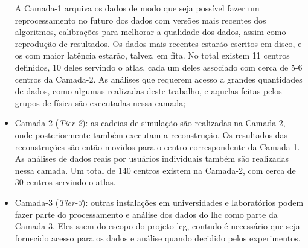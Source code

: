 \begin{itemize}
A Camada-1 arquiva os dados de modo que seja possível fazer um reprocessamento 
no futuro dos dados com versões mais recentes dos algoritmos, calibrações 
para melhorar a qualidade dos dados, assim como reprodução de resultados.
Os dados mais recentes estarão escritos em disco, e os com
maior latência estarão, talvez, em fita. No total existem 11 centros definidos,
10 deles servindo o \gls{atlas}, cada um deles associado com cerca de 5-6
centros da Camada-2.
As análises que requerem acesso a grandes quantidades de dados, como algumas
realizadas deste trabalho, e aquelas feitas pelos grupos de física são executadas 
nessa camada;
\item Camada-2 (\emph{Tier-2}): as cadeias de simulação são realizadas na Camada-2, onde
posteriormente também executam a reconstrução. Os resultados das reconstruções
são então movidos para o centro correspondente da Camada-1. 
As análises de dados reais por usuários individuais também são realizadas nessa
camada. Um total de 140 centros existem na Camada-2, com cerca de 30 centros
servindo o \gls{atlas}.
\item Camada-3 (\emph{Tier-3}): outras instalações em universidades e
laboratórios podem fazer parte do processamento e análise dos dados do
\gls{lhc} como parte da Camada-3. Eles saem do escopo do projeto \gls{lcg}, contudo é
necessário que seja fornecido acesso para os dados e análise quando decidido
pelos experimentos.
\end{itemize}





